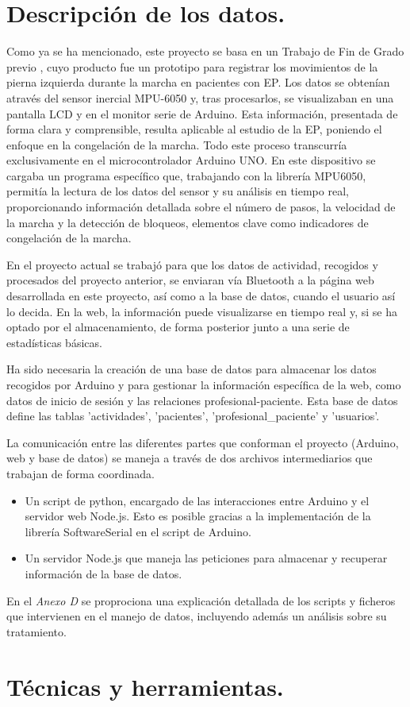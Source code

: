 
\section{Descripción de los datos.}

Como ya se ha mencionado, este proyecto se basa en un Trabajo de Fin de Grado previo \cite{saragonz91:online}, cuyo producto fue un prototipo para registrar los movimientos de la pierna izquierda durante la marcha en pacientes con EP. Los datos se obtenían através del sensor inercial MPU-6050 y, tras procesarlos, se visualizaban en una pantalla LCD y en el monitor serie de Arduino. Esta información, presentada de forma clara y comprensible, resulta aplicable al estudio de la EP, poniendo el enfoque en la congelación de la marcha. Todo este proceso transcurría exclusivamente en el microcontrolador Arduino UNO. En este dispositivo se cargaba un programa específico que, trabajando con la librería MPU6050, permitía la lectura de los datos del sensor y su análisis en tiempo real, proporcionando información detallada sobre el número de pasos, la velocidad de la marcha y la detección de bloqueos, elementos clave como indicadores de congelación de la marcha.

En el proyecto actual se trabajó para que los datos de actividad, recogidos y procesados del proyecto anterior, se enviaran vía Bluetooth a la página web desarrollada en este proyecto, así como a la base de datos, cuando el usuario así lo decida. En la web, la información puede visualizarse en tiempo real y, si se ha optado por el almacenamiento, de forma posterior junto a una serie de estadísticas básicas.

Ha sido necesaria la creación de una base de datos para almacenar los datos recogidos por Arduino y para gestionar la información específica de la web, como datos de inicio de sesión y las relaciones profesional-paciente. Esta base de datos define las tablas 'actividades', 'pacientes', 'profesional\_paciente' y 'usuarios'.

La comunicación entre las diferentes partes que conforman el proyecto (Arduino, web y base de datos) se maneja a través de dos archivos intermediarios que trabajan de forma coordinada. 
\begin{itemize}
    \item Un script de python, encargado de las interacciones entre Arduino y el servidor web Node.js. Esto es posible gracias a la implementación de la librería SoftwareSerial en el script de Arduino.
    \item Un servidor Node.js que maneja las peticiones para almacenar y recuperar información de la base de datos.
\end{itemize}


En el \textit{Anexo D} se proprociona una explicación detallada de los scripts y ficheros que intervienen en el manejo de datos, incluyendo además un análisis sobre su tratamiento.

 
\section{Técnicas y herramientas.}




